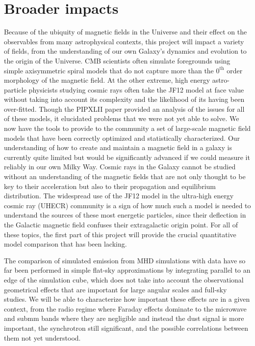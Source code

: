 \section*{Broader impacts}

Because of the ubiquity of magnetic fields in the Universe and their effect on the observables from many astrophysical contexts, this project will impact a variety of fields, from the understanding of our own Galaxy's dynamics and evolution to the origin of the Universe.  CMB scientists often simulate foregrounds using simple axisymmetric spiral models that do not capture more than the $0^\mathrm{th}$ order morphology of the magnetic field. At the other extreme, high energy astro-particle physicists studying cosmic rays often take the JF12 model at face value without taking into account its complexity and the likelihood of its having been over-fitted. Though the PIPXLII paper provided an analysis of the issues for all of these models, it elucidated problems that we were not yet able to solve. We now have the tools to provide to the community a set of large-scale magnetic field models that have been correctly optimized and statistically characterized.  Our understanding of how to create and maintain a magnetic field in a galaxy is currently quite limited but would be significantly advanced if we could measure it reliably in our own Milky Way.  Cosmic rays in the Galaxy cannot be studied without an understanding of the magnetic fields that are not only thought to be key to their acceleration but also to their propagation and equilibrium distribution.  The widespread use of the JF12 model in the ultra-high energy cosmic ray (UHECR) community is a sign of how much such a model is needed to understand the sources of these most energetic particles, since their deflection in the Galactic magnetic field confuses their extragalactic origin point.  For all of these topics, the first part of this project will provide the crucial quantitative model comparison that has been lacking.  

The comparison of simulated emission from MHD simulations with data have so far been performed in simple flat-sky approximations by integrating parallel to an edge of the simulation cube, which does not take into account the observational geometrical effects that are important for large angular scales and full-sky studies. We will be able to characterize how important these effects are in a given context, from the radio regime where Faraday effects dominate to the microwave and submm bands where they are negligible and instead the dust signal is more important, the synchrotron still significant, and the possible correlations between them not yet understood.  

